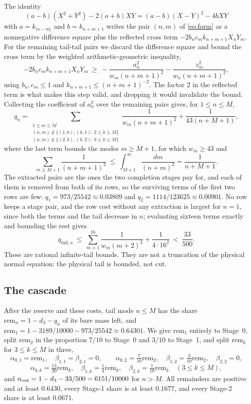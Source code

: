\documentclass[10pt]{article}
\theoremstyle{remark}
\newcommand{\dthree}{d_{3}}
\begin{document}
The identity
\[
(a-b)(X^2+Y^2)-2(a+b)XY=(a-b)(X-Y)^2-4bXY
\]
with $a=k_{|n-m|}$ and $b=k_{n+m+1}$ writes the pair $(n,m)$ of \eqref{eq:form} as a nonnegative difference square plus the reflected cross term $-2b_nc_mk_{n+m+1}X_nY_m$. For the remaining tail-tail pairs we discard the difference square and bound the cross term by the weighted arithmetic-geometric inequality,
\[
-2b_nc_mk_{n+m+1}X_nY_m\ \ge\ -\frac{a_n^2}{w_m(n+m+1)^2}-\frac{z_m^2}{w_n(n+m+1)^2},
\]
using $b_n,c_m\le1$ and $k_{n+m+1}\le(n+m+1)^{-2}$. The factor $2$ in the reflected term is what makes this step valid, and dropping it would invalidate the bound. Collecting the coefficient of $a_n^2$ over the remaining pairs gives, for $1\le n\le M$,
\begin{equation}\label{eq:qred}
q_n=\sum_{\substack{1\le m\le M\\(n,m)\notin\{(1,k),(k,1):\,2\le k\le M\}\\(n,m)\notin\{(2,k),(k,2):\,3\le k\le M\}}}\frac1{w_m(n+m+1)^2}+\frac1{43(n+M+1)},
\end{equation}
where the last term bounds the modes $m\ge M+1$, for which $w_m\ge43$ and
\[
\sum_{m\ge M+1}\frac1{(n+m+1)^2}\ \le\ \int_{M+1}^{\infty}\frac{dm}{(n+m)^2}=\frac1{n+M+1}.
\]
The extracted pairs are the ones the two completion stages pay for, and each of them is removed from both of its rows, so the surviving terms of the first two rows are few: $q_1=973/25542\approx0.03809$ and $q_2=1114/123625\approx0.00901$. No row keeps a stage pair, and the row cost without any extraction is largest for $n=1$, since both the terms and the tail decrease in $n$; evaluating sixteen terms exactly and bounding the rest gives
\begin{equation}\label{eq:qcap}
q_{\mathrm{full},n}\ \le\ \sum_{m=1}^{16}\frac1{w_m(m+2)^2}+\frac1{4\cdot16^2}\ <\ \frac{33}{500}.
\end{equation}
These are rational infinite-tail bounds. They are not a truncation of the physical normal equation: the physical tail is bounded, not cut.

\subsection{The cascade}

After the reserve and these costs, tail mode $n\le M$ has the share $\mathrm{rem}_n=1-\dthree-q_n$ of its bare mass left, and $\mathrm{rem}_1=1-3189/10000-973/25542\approx0.64301$. We give $\mathrm{rem}_1$ entirely to Stage~0, split $\mathrm{rem}_2$ in the proportion $7/10$ to Stage~0 and $3/10$ to Stage~1, and split $\mathrm{rem}_k$ for $3\le k\le M$ in three,
\[
\alpha_{0,1}=\mathrm{rem}_1,\quad \beta_{1,1}=\beta_{2,1}=0,\qquad
\alpha_{0,2}=\tfrac7{10}\mathrm{rem}_2,\quad \beta_{1,2}=\tfrac3{10}\mathrm{rem}_2,\quad \beta_{2,2}=0,
\]
\[
\alpha_{0,k}=\tfrac{13}{20}\mathrm{rem}_k,\quad \beta_{1,k}=\tfrac14\mathrm{rem}_k,\quad \beta_{2,k}=\tfrac1{10}\mathrm{rem}_k\quad(3\le k\le M),
\]
and $\alpha_{\rm ext}=1-\dthree-33/500=6151/10000$ for $n>M$. All remainders are positive and at least $0.6430$, every Stage-1 share is at least $0.1677$, and every Stage-2 share is at least $0.0671$.
\end{document}
